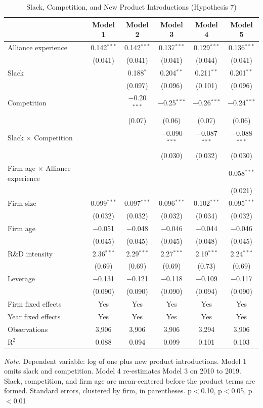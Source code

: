 \documentclass[12pt]{article}
\begin{document}
\begin{table}[p]
\centering\small
\caption{Slack, Competition, and New Product Introductions (Hypothesis 7)}
\begin{tabular}{lccccc}
\toprule
 & Model 1 & Model 2 & Model 3 & Model 4 & Model 5 \\
\midrule
Alliance experience & 0.142$^{***}$ & 0.142$^{***}$ & 0.137$^{***}$ & 0.129$^{***}$ & 0.136$^{***}$ \\
 & (0.041) & (0.041) & (0.041) & (0.044) & (0.041) \\[2pt]
Slack &  & 0.188$^{*}$ & 0.204$^{**}$ & 0.211$^{**}$ & 0.201$^{**}$ \\
 &  & (0.097) & (0.096) & (0.101) & (0.096) \\[2pt]
Competition &  & $-$0.20$^{***}$ & $-$0.25$^{***}$ & $-$0.26$^{***}$ & $-$0.24$^{***}$ \\
 &  & (0.07) & (0.06) & (0.07) & (0.06) \\[2pt]
Slack $\times$ Competition &  &  & $-$0.090$^{***}$ & $-$0.087$^{***}$ & $-$0.088$^{***}$ \\
 &  &  & (0.030) & (0.032) & (0.030) \\[2pt]
Firm age $\times$ Alliance experience &  &  &  &  & 0.058$^{***}$ \\
 &  &  &  &  & (0.021) \\[2pt]
Firm size & 0.099$^{***}$ & 0.097$^{***}$ & 0.096$^{***}$ & 0.102$^{***}$ & 0.095$^{***}$ \\
 & (0.032) & (0.032) & (0.032) & (0.034) & (0.032) \\[2pt]
Firm age & $-$0.051 & $-$0.048 & $-$0.046 & $-$0.044 & $-$0.046 \\
 & (0.045) & (0.045) & (0.045) & (0.048) & (0.045) \\[2pt]
R\&D intensity & 2.36$^{***}$ & 2.29$^{***}$ & 2.27$^{***}$ & 2.19$^{***}$ & 2.24$^{***}$ \\
 & (0.69) & (0.69) & (0.69) & (0.73) & (0.69) \\[2pt]
Leverage & $-$0.131 & $-$0.121 & $-$0.118 & $-$0.109 & $-$0.117 \\
 & (0.090) & (0.090) & (0.090) & (0.094) & (0.090) \\[2pt]
\midrule
Firm fixed effects & Yes & Yes & Yes & Yes & Yes \\
Year fixed effects & Yes & Yes & Yes & Yes & Yes \\
Observations & 3,906 & 3,906 & 3,906 & 3,294 & 3,906 \\
R$^2$ & 0.088 & 0.094 & 0.099 & 0.101 & 0.103 \\
\bottomrule
\end{tabular}
\begin{minipage}{0.92\textwidth}\footnotesize\smallskip
\textit{Note.} Dependent variable: log of one plus new product introductions. Model 1 omits slack and competition. Model 4 re-estimates Model 3 on 2010 to 2019. Slack, competition, and firm age are mean-centered before the product terms are formed. Standard errors, clustered by firm, in parentheses. \textasteriskcentered{} p$<$0.10, \textasteriskcentered{}\textasteriskcentered{} p$<$0.05, \textasteriskcentered{}\textasteriskcentered{}\textasteriskcentered{} p$<$0.01
\end{minipage}
\end{table}
\end{document}
